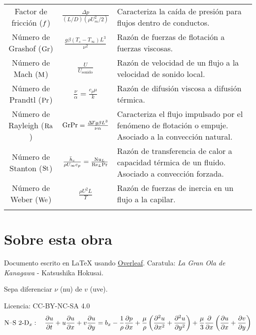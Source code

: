 \begin{table}[htb!]
\begin{tabularx}{12cm}{ *{2}{c}
>{\scriptsize\arraybackslash}X }
Factor de fricción ($f$) & $ \frac{\Delta p}{(L/D)\left(\rho U^2_m/2\right)}$          &Caracteriza la caída de presión para flujos dentro de conductos.                \\
Número de Grashof ($\textrm{Gr}$) &  $\frac{g\beta \left(T_s -T_\infty \right) L^3}{\nu^2}$          &Razón de fuerzas de flotación a fuerzas viscosas.                \\
Número de Mach   ($\textrm{M}$)   &    $\frac{U}{U_{\textrm{sonido}}}$        & Razón de velocidad de un flujo a la velocidad de sonido local.              \\
Número de Prandtl  ($\textrm{Pr}$) &     $\frac{\nu}{\alpha}=\frac{c_p \mu}{k}$       &Razón de difusión viscosa a difusión térmica.               \\
Número de Rayleigh ($\textrm{Ra}$) &  $\textrm{Gr}\textrm{Pr} = \frac{\Delta \!T g\beta L^3}{\nu \alpha}$          & Caracteriza el flujo impulsado por el fenómeno de flotación o empuje. Asociado a la convección natural.             \\
Número de Stanton ($\textrm{St}$)  &   $\frac{\bar{h}_c }{\rho U_\infty c_p}=\frac{\textrm{Nu}_L}{\textrm{Re}_L \textrm{Pr}}$         &Razón de transferencia de calor a capacidad térmica de un fluido. Asociado a convección forzada.\\
Número de Weber ($\textrm{We}$)  &   $\frac{\rho U^2 L}{\Upsilon}$         &Razón de fuerzas de inercia en un flujo a la capilar.\\
\hhline
\end{tabularx}
\end{table} 

\tableofcontents

\section*{Sobre esta obra}
Documento escrito en \textrm{\LaTeX} usando \href{https://www.overleaf.com}{Overleaf}. Caratula: \emph{ La Gran Ola de Kanagawa }- Katsushika Hokusai. \par

Sepa diferenciar $\nu$ (nu) de $v$ (uve).\par
 \vspace{.1cm}
 \vspace{1cm}
 \begingroup

\selectfont
\noindent
 Licencia: CC-BY-NC-SA 4.0
 \endgroup
 \begingroup
    $$\textrm{N--S 2-D}_x:\quad \frac{\partial u}{\partial t}+u\frac{\partial u}{\partial x}+v\frac{\partial u}{\partial y}=b_x-\frac{1}{\rho}\frac{\partial p}{\partial x}+\frac{\mu}{\rho}\left(\frac{\partial^2 u}{\partial x ^2}+\frac{\partial^2 u}{\partial y ^2}\right) + \frac{\mu}{3}\frac{\partial  }{\partial x}\left( \frac{\partial u}{\partial x}+\frac{\partial v}{\partial y}\right)$$
 \endgroup